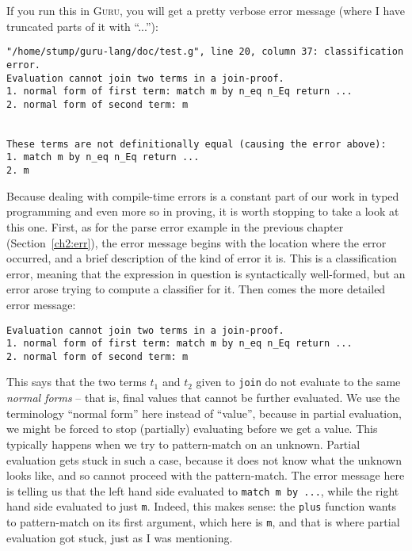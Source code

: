 \documentclass{book}[12pt]
\newcommand{\guru}[0]{\textsc{Guru}\xspace}
\begin{document}
 \noindent If you run this in \guru, you will get a pretty verbose error message
(where I have truncated parts of it with ``...''):

\begin{verbatim}
"/home/stump/guru-lang/doc/test.g", line 20, column 37: classification error.
Evaluation cannot join two terms in a join-proof.
1. normal form of first term: match m by n_eq n_Eq return ...
2. normal form of second term: m


These terms are not definitionally equal (causing the error above):
1. match m by n_eq n_Eq return ...
2. m
\end{verbatim}

 \noindent Because dealing with compile-time errors is a constant part
of our work in typed programming and even more so in proving, it is
worth stopping to take a look at this one.  First, as for the parse
error example in the previous chapter (Section~\ref{ch2:err}), the
error message begins with the location where the error occurred, and a
brief description of the kind of error it is.  This is a
classification error, meaning that the expression in question is
syntactically well-formed, but an error arose trying to compute a
classifier for it.  Then comes the more detailed error message:

\begin{verbatim}
Evaluation cannot join two terms in a join-proof.
1. normal form of first term: match m by n_eq n_Eq return ...
2. normal form of second term: m
\end{verbatim}

 \noindent This says that the two terms $t_1$ and $t_2$ given to
\texttt{join} do not evaluate to the same \emph{normal forms} -- that
is, final values that cannot be further evaluated.  We use the
terminology ``normal form'' here instead of ``value'', because in
partial evaluation, we might be forced to stop (partially) evaluating
before we get a value.  This typically happens when we try to
pattern-match on an unknown.  Partial evaluation gets stuck in such a
case, because it does not know what the unknown looks like, and so
cannot proceed with the pattern-match.  The error message here is
telling us that the left hand side evaluated to \texttt{match m by
...}, while the right hand side evaluated to just \texttt{m}.  Indeed,
this makes sense: the \texttt{plus} function wants to pattern-match on
its first argument, which here is \texttt{m}, and that is where
partial evaluation got stuck, just as I was mentioning.
\end{document}
